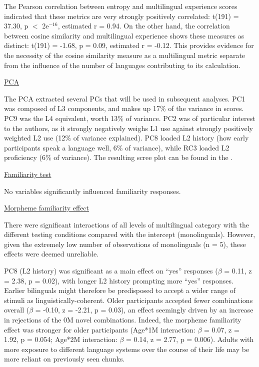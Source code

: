 The Pearson correlation between entropy and multilingual experience scores indicated that these metrics are very strongly positively correlated: t(191) = 37.30, p $<$ 2e$^{-16}$, estimated r  = 0.94. On the other hand, the correlation between cosine similarity and multilingual experience shows these measures as distinct: t(191) = -1.68, p = 0.09, estimated r = -0.12. This provides evidence for the necessity of the cosine similarity measure as a multilingual metric separate from the influence of the number of languages contributing to its calculation.  

\noindent
\underline{PCA}

\noindent
The PCA extracted several PCs that will be used in subsequent analyses. PC1 was composed of L3 components, and makes up 17\% of the variance in scores. PC9 was the L4 equivalent, worth 13\% of variance. PC2 was of particular interest to the authors, as it strongly negatively weighs L1 use against strongly positively weighted L2 use (12\% of variance explained). PC8 loaded L2 history (how early participants speak a language well, 6\% of variance), while RC3 loaded L2 proficiency (6\% of variance). The resulting scree plot can be found in the .

\noindent
\underline{Familiarity test}

\noindent
No variables significantly influenced familiarity responses. 

\noindent
\underline{Morpheme familiarity effect}

\noindent
There were significant interactions of all levels of multilingual category with the different testing conditions compared with the intercept (monolinguals). However, given the extremely low number of observations of monolinguals (n = 5), these effects were deemed unreliable. 

PC8 (L2 history) was significant as a main effect on ``yes'' responses ($\beta$ = 0.11, z = 2.38, p = 0.02), with longer L2 history prompting more ``yes'' responses. Earlier bilinguals might therefore be predisposed to accept a wider range of stimuli as linguistically-coherent. Older participants accepted fewer combinations overall ($\beta$ = -0.10, z = -2.21, p = 0.03), an effect seemingly driven by an increase in rejections of the 0M novel combinations. Indeed, the morpheme familiarity effect was stronger for older participants (Age*1M interaction: $\beta$ = 0.07, z = 1.92, p = 0.054; Age*2M interaction: $\beta$ = 0.14, z = 2.77, p = 0.006). Adults with more exposure to different language systems over the course of their life may be more reliant on previously seen chunks.

